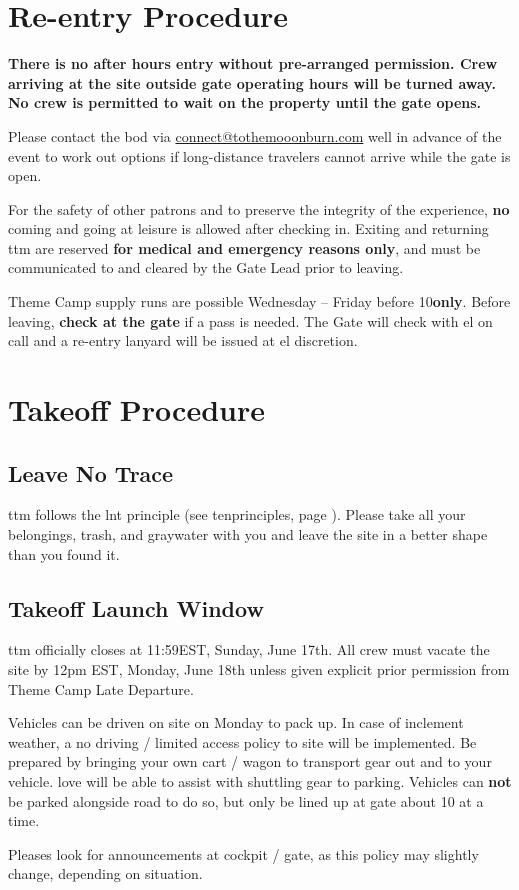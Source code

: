 \section*{Re-entry Procedure}

\textbf{There is no after hours entry without pre-arranged permission.  Crew arriving at the site outside gate operating hours will be turned away.  No crew is permitted to wait on the property until the gate opens.}

Please contact the \gls{bod} via \url{connect@tothemooonburn.com} well in advance of the event to work out options if long-distance travelers cannot arrive while the gate is open.

For the safety of other patrons and to preserve the integrity of the experience, \textbf{no} coming and going at leisure is allowed after checking in.  Exiting and returning \gls{ttm} are reserved \textbf{for medical and emergency reasons only}, and must be communicated to and cleared by the Gate Lead prior to leaving.

Theme Camp supply runs are possible Wednesday -- Friday before 10\pm \textbf{only}. Before leaving, \textbf{check at the gate} if a pass is needed. The Gate will check with \Gls{el} on call and a re-entry lanyard will be issued at \gls{el} discretion.


\section*{Takeoff Procedure}
\subsection*{Leave No Trace}
\Gls{ttm} follows the \gls{lnt} principle (see \gls{tenprinciples}, page \pageref{tenprinciples}). Please take all your belongings, trash, and \gls{graywater} with you and leave the site in a better shape than you found it.

\subsection*{Takeoff Launch Window}

\Gls{ttm} officially closes at 11:59\pm EST, Sunday, June 17th.  All crew must vacate the site by 12pm EST, Monday, June 18th unless given explicit prior permission from Theme Camp Late Departure.

Vehicles can be driven on site on Monday to pack up. In case of inclement weather, a no driving / limited access policy to site will be implemented. Be prepared by bringing your own cart / wagon to transport gear out and to your vehicle.
\Gls{love} will be able to assist with shuttling gear to parking. 
Vehicles can \textbf{not} be parked alongside road to do so, but only be lined up at gate about 10 at a time.

Pleases look for announcements at \Gls{cockpit} / \Gls{gate}, as this policy may slightly change, depending on situation. 

